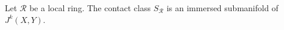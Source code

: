 Let $\mathcal{R}$ be a local ring. The contact class $S_{\mathcal{R}}$ is an immersed submanifold of $J^k(X, Y)$.

